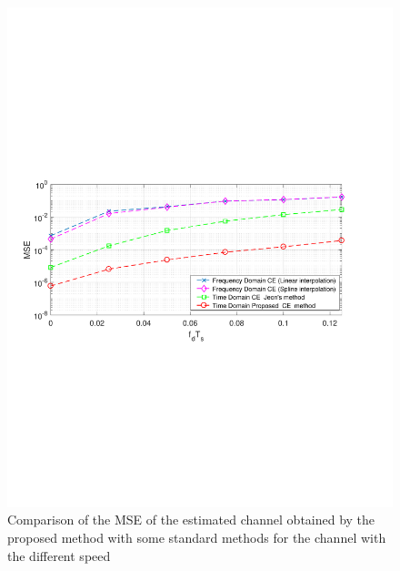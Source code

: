 \documentclass[12pt,journal,draftclsnofoot,onecolumn]{IEEEtran}
\begin{document}
{{{\begin{figure}
	\centering
	\includegraphics[width=1.0\linewidth]{figures/mse_speed.pdf}
	\caption{Comparison of the MSE of the estimated channel obtained by the proposed	method with some standard methods for the channel with the different speed}
	\label{fig:msespeed}
\end{figure}
				
}}}
\end{document}
